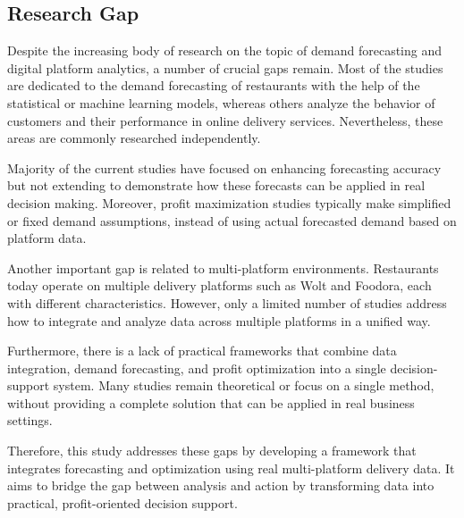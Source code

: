 \subsection{Research Gap}

Despite the increasing body of research on the topic of demand forecasting and digital platform analytics, a number of crucial gaps remain. Most of the studies are dedicated to the demand forecasting of restaurants with the help of the statistical or machine learning models, whereas others analyze the behavior of customers and their performance in online delivery services. Nevertheless, these areas are commonly researched independently.

Majority of the current studies have focused on enhancing forecasting accuracy but not extending to demonstrate how these forecasts can be applied in real decision making. Moreover, profit maximization studies typically make simplified or fixed demand assumptions, instead of using actual forecasted demand based on platform data.

Another important gap is related to multi-platform environments. Restaurants today operate on multiple delivery platforms such as Wolt and Foodora, each with different characteristics. However, only a limited number of studies address how to integrate and analyze data across multiple platforms in a unified way.

Furthermore, there is a lack of practical frameworks that combine data integration, demand forecasting, and profit optimization into a single decision-support system. Many studies remain theoretical or focus on a single method, without providing a complete solution that can be applied in real business settings.

Therefore, this study addresses these gaps by developing a framework that integrates forecasting and optimization using real multi-platform delivery data. It aims to bridge the gap between analysis and action by transforming data into practical, profit-oriented decision support.